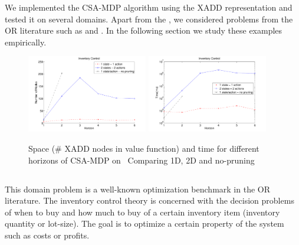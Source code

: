 \label{sec:results}
 
We implemented the CSA-MDP algorithm using the XADD representation and tested it on several domains. Apart from the \MarsRoverNL, we considered problems from the OR
literature such as \InventoryControl and \WaterReservoir. In the following
section we study these examples empirically.
 
\begin{figure}[t]
\centering
\includegraphics[width=0.47\textwidth]{Figures1/space1-3.pdf}
\hspace{5mm}
\includegraphics[width=0.47\textwidth]{Figures1/time1-3.pdf}
\caption{\footnotesize
Space (\# XADD nodes in value function) and
time for different horizons of CSA-MDP on \InventoryControl\
Comparing 1D, 2D and no-pruning}
\label{fig:invC}
\end{figure}
 
\subsection{\InventoryControl}
This domain problem is a well-known optimization benchmark in the OR
literature. The inventory control theory is concerned with the decision problems of when to buy and how much to buy of a certain inventory item (inventory quantity or lot-size). The goal is to optimize a certain property of the system such as costs or profits. \cite{scarf_inv}

